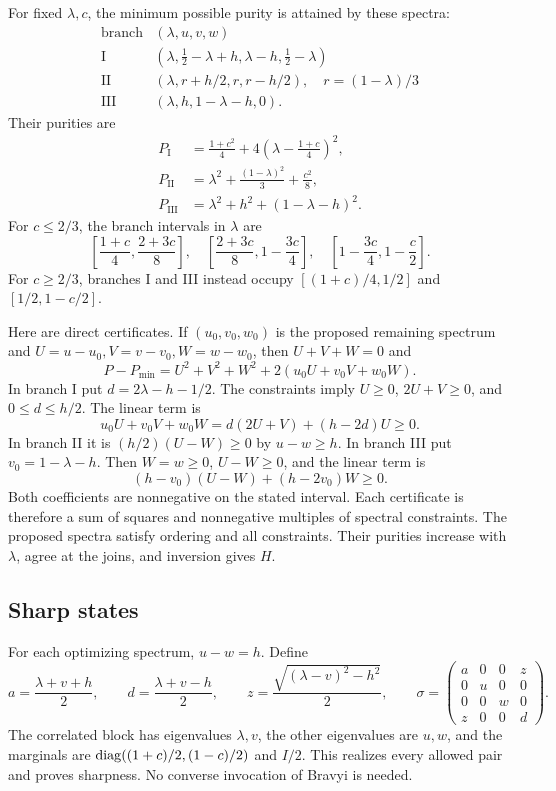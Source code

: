 For fixed $\lambda,c$, the minimum possible purity is attained by these spectra:
\[
\begin{array}{c|c}
 \text{branch}&(\lambda,u,v,w)\\ \hline
 \mathrm I&(\lambda,\frac12-\lambda+h,\lambda-h,\frac12-\lambda)\\[2pt]
 \mathrm {II}&(\lambda,r+h/2,r,r-h/2),\quad r=(1-\lambda)/3\\[2pt]
 \mathrm {III}&(\lambda,h,1-\lambda-h,0).
\end{array}
\]
Their purities are
\begin{align*}
 P_{\mathrm I}&=\frac{1+c^2}{4}+4\left(\lambda-\frac{1+c}{4}\right)^2,\\
 P_{\mathrm {II}}&=\lambda^2+\frac{(1-\lambda)^2}{3}+\frac{c^2}{8},\\
 P_{\mathrm {III}}&=\lambda^2+h^2+(1-\lambda-h)^2.
\end{align*}
For $c\le2/3$, the branch intervals in $\lambda$ are
\[
 \left[\frac{1+c}{4},\frac{2+3c}{8}\right],\quad
 \left[\frac{2+3c}{8},1-\frac{3c}{4}\right],\quad
 \left[1-\frac{3c}{4},1-\frac c2\right].
\]
For $c\ge2/3$, branches I and III instead occupy
$[(1+c)/4,1/2]$ and $[1/2,1-c/2]$.

Here are direct certificates. If $(u_0,v_0,w_0)$ is the proposed remaining spectrum and $U=u-u_0,V=v-v_0,W=w-w_0$, then $U+V+W=0$ and
\[
 P-P_{\min}=U^2+V^2+W^2+2(u_0U+v_0V+w_0W).
\]
In branch I put $d=2\lambda-h-1/2$. The constraints imply $U\ge0$, $2U+V\ge0$, and $0\le d\le h/2$. The linear term is
\[
 u_0U+v_0V+w_0W=d(2U+V)+(h-2d)U\ge0.
\]
In branch II it is $(h/2)(U-W)\ge0$ by $u-w\ge h$.
In branch III put $v_0=1-\lambda-h$. Then $W=w\ge0$, $U-W\ge0$, and the linear term is
\[
 (h-v_0)(U-W)+(h-2v_0)W\ge0.
\]
Both coefficients are nonnegative on the stated interval. Each certificate is therefore a sum of squares and nonnegative multiples of spectral constraints. The proposed spectra satisfy ordering and all constraints. Their purities increase with $\lambda$, agree at the joins, and inversion gives $H$.

\subsection{Sharp states}
For each optimizing spectrum, $u-w=h$. Define
\[
 a=\frac{\lambda+v+h}{2},\qquad d=\frac{\lambda+v-h}{2},\qquad
 z=\frac{\sqrt{(\lambda-v)^2-h^2}}2,
\qquad
 \sigma=\begin{pmatrix}
 a&0&0&z\\0&u&0&0\\0&0&w&0\\z&0&0&d
 \end{pmatrix}.
\]
The correlated block has eigenvalues $\lambda,v$, the other eigenvalues are $u,w$, and the marginals are $\operatorname{diag}((1+c)/2,(1-c)/2)$ and $I/2$. This realizes every allowed pair and proves sharpness. No converse invocation of Bravyi is needed.

